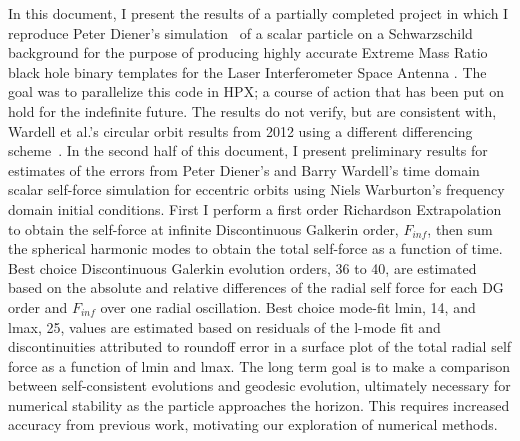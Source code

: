 \documentclass[12pt,letterpaper]{lsuetd}
\begin{document}
\pagebreak

\renewenvironment{abstract}{{\hspace{-2.2em} \huge \textbf{\abstractname}} \par}{\pagebreak}
\begin{abstract}
\vspace{0.55ex}
\doublespacing
In this document, I present the results of a partially completed project in which I reproduce Peter Diener's simulation~\cite{heffernan_ottewil_wardell_modesum_basisForCode} of a scalar particle on a Schwarzschild background for the purpose of producing highly accurate Extreme Mass Ratio black hole binary templates for the Laser Interferometer Space Antenna . The goal was to parallelize this code in HPX; a course of action that has been put on hold for the indefinite future. The results do not verify, but are consistent with, Wardell et al.'s circular orbit results from 2012 using a different differencing scheme~\cite{wardell_vega_thornburg_diener}. In the second half of this document, I present preliminary results for estimates of the errors from Peter Diener's and Barry Wardell's time domain scalar self-force simulation for eccentric orbits using Niels Warburton's frequency domain initial conditions. First I perform a first order Richardson Extrapolation to obtain the self-force at infinite Discontinuous Galkerin order, $F_{inf}$, then sum the spherical harmonic modes to obtain the total self-force as a function of time. Best choice Discontinuous Galerkin evolution orders, 36 to 40, are estimated based on the absolute and relative differences of the radial self force for each DG order and $F_{inf}$ over one radial oscillation. Best choice mode-fit lmin, 14, and lmax, 25, values are estimated based on residuals of the l-mode fit and discontinuities attributed to roundoff error in a surface plot of the total radial self force as a function of lmin and lmax. The long term goal is to make a comparison between self-consistent evolutions and geodesic evolution, ultimately necessary for numerical stability as the particle approaches the horizon. This requires increased accuracy from previous work, motivating our exploration of numerical methods. 
\end{abstract}
\end{document}
